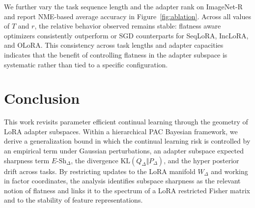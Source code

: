 \documentclass[10pt]{article} %
\begin{document}
We further vary the task sequence length and the adapter rank on ImageNet-R and report NME-based average accuracy in Figure~\ref{fig:ablation}. Across all values of $T$ and $r$, the relative behavior observed remains stable: flatness aware optimizers consistently outperform or SGD counterparts for SeqLoRA, IncLoRA, and OLoRA. This consistency across task lengths and adapter capacities indicates that the benefit of controlling flatness in the adapter subspace is systematic rather than tied to a specific configuration.

















\section{Conclusion}


This work revisits parameter efficient continual learning through the geometry of LoRA adapter subspaces. Within a hierarchical PAC Bayesian framework, we derive a generalization bound in which the continual learning risk is controlled by an empirical term under Gaussian perturbations, an adapter subspace expected sharpness term $E\mbox{-}\mathrm{Sh}_\Delta$, the divergence $\mathrm{KL}(Q_\Delta \Vert P_\Delta)$, and the hyper posterior drift across tasks. By restricting updates to the LoRA manifold $W_\Delta$ and working in factor coordinates, the analysis identifies subspace sharpness as the relevant notion of flatness and links it to the spectrum of a LoRA restricted Fisher matrix and to the stability of feature representations.
\end{document}
